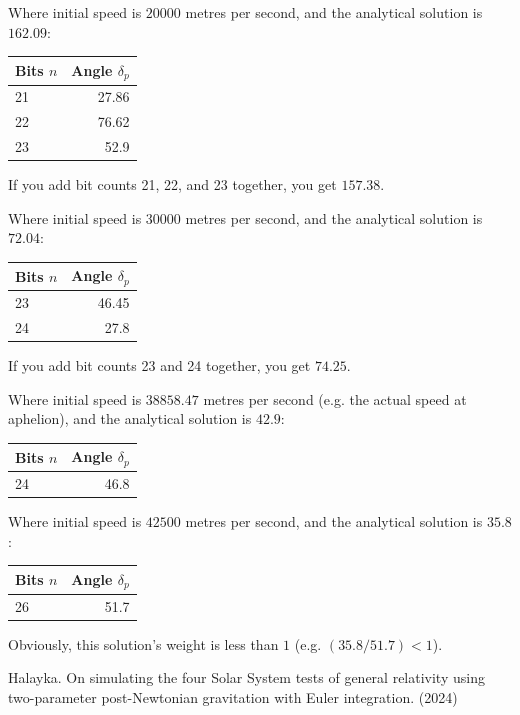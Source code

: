 \documentclass[12pt]{article}
\begin{document}
Where initial speed is $20000$ metres per second, and the analytical solution is $162.09$:
\begin{center}
\begin{tabular}{| l | r |}
  \hline
Bits $n$ & Angle $\delta_{p}$\\
\hline
\hline
21 & 27.86 \\
22 & 76.62 \\
23 & 52.9 \\
  \hline  
\end{tabular}
\end{center}
If you add bit counts 21, 22, and 23 together, you get $157.38$.

Where initial speed is $30000$ metres per second, and the analytical solution is $72.04$:
\begin{center}
\begin{tabular}{| l | r |}
  \hline
Bits $n$ & Angle $\delta_{p}$\\
\hline
\hline
23 & 46.45 \\
24 & 27.8 \\
  \hline  
\end{tabular}
\end{center}
If you add bit counts 23 and 24 together, you get $74.25$.

Where initial speed is $38858.47$ metres per second (e.g. the actual speed at aphelion), and the analytical solution is $42.9$:
\begin{center}
\begin{tabular}{| l | r |}
  \hline
Bits $n$ & Angle $\delta_{p}$ \\
\hline
\hline
24 & 46.8 \\
  \hline  
\end{tabular}
\end{center}

Where initial speed is $42500$ metres per second, and the analytical solution is $35.8$:
\begin{center}
\begin{tabular}{| l | r |}
  \hline
Bits $n$ & Angle $\delta_{p}$\\
\hline
\hline
26 & 51.7 \\
  \hline  
\end{tabular}
\end{center}
Obviously, this solution's weight is less than $1$ (e.g. $(35.8 / 51.7) < 1$).






\begin{thebibliography}{9}


 Halayka. On simulating the four Solar System tests of general relativity using two-parameter post-Newtonian gravitation with Euler integration. (2024)

\end{thebibliography}
\end{document}
